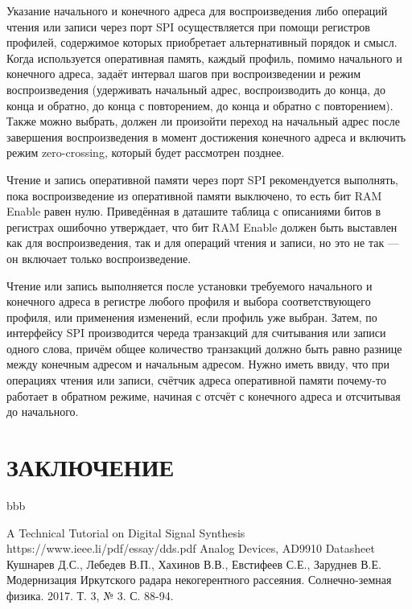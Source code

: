 \documentclass[rusmathsym, eqnumwithinsec, amspack, hyperref]{bomgost}
\begin{document}
Указание начального и конечного адреса для воспроизведения либо операций чтения или записи через порт SPI осуществляется при помощи регистров профилей, содержимое которых приобретает альтернативный порядок и смысл. Когда используется оперативная память, каждый профиль, помимо начального и конечного адреса, задаёт интервал шагов при воспроизведении и режим воспроизведения (удерживать начальный адрес, воспроизводить до конца, до конца и обратно, до конца с повторением, до конца и обратно с повторением). Также можно выбрать, должен ли произойти переход на начальный адрес после завершения воспроизведения в момент достижения конечного адреса и включить режим zero-crossing, который будет рассмотрен позднее.

Чтение и запись оперативной памяти через порт SPI рекомендуется выполнять, пока воспроизведение из оперативной памяти выключено, то есть бит RAM Enable равен нулю. Приведённая в даташите таблица с описаниями битов в регистрах ошибочно утверждает, что бит RAM Enable должен быть выставлен как для воспроизведения, так и для операций чтения и записи, но это не так --- он включает только воспроизведение.

Чтение или запись выполняется после установки требуемого начального и конечного адреса в регистре любого профиля и выбора соответствующего профиля, или применения изменений, если профиль уже выбран. Затем, по интерфейсу SPI производится череда транзакций для считывания или записи одного слова, причём общее количество транзакций должно быть равно разнице между конечным адресом и начальным адресом. Нужно иметь ввиду, что при операциях чтения или записи, счётчик адреса оперативной памяти почему-то работает в обратном режиме, начиная с отсчёт с конечного адреса и отсчитывая до начального.

\section*{ЗАКЛЮЧЕНИЕ}
bbb

\begin{thebibliography}{11}
 A Technical Tutorial
on Digital Signal Synthesis https://www.ieee.li/pdf/essay/dds.pdf
 Analog Devices, AD9910 Datasheet
 Кушнарев Д.С., Лебедев В.П., Хахинов В.В., Евстифеев С.Е., Заруднев В.Е. Модернизация Иркутского радара некогерентного рассеяния. Солнечно-земная физика. 2017. Т. 3, № 3. С. 88-94.
\end{thebibliography}
\end{document}
